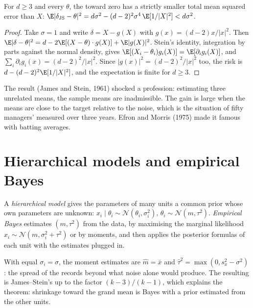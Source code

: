 \begin{theorem}\label{thm:qm:bayesian-methods:js}
For $d \ge 3$ and every $\theta$, the  toward zero has a strictly smaller total mean squared error than $X$:
$\E\lvert\delta_{\mathrm{JS}} - \theta\rvert^2 = d\sigma^2 - (d - 2)^2\sigma^4\,\E[1/\lvert X\rvert^2] < d\sigma^2$.
\end{theorem}

\begin{proof}
Take $\sigma = 1$ and write $\delta = X - g(X)$ with $g(x) = (d - 2)x/\lvert x\rvert^2$. Then $\E\lvert\delta - \theta\rvert^2 = d -
2\E[(X - \theta)\cdot g(X)] + \E\lvert g(X)\rvert^2$. Stein's identity, integration by parts against the normal density, gives
$\E[(X_i - \theta_i)g_i(X)] = \E[\partial_ig_i(X)]$, and $\sum_i\partial_ig_i(x) = (d - 2)^2/\lvert x\rvert^2$. Since $\lvert g(x)\rvert^2 = (d
- 2)^2/\lvert x\rvert^2$ too, the risk is $d - (d - 2)^2\E[1/\lvert X\rvert^2]$, and the expectation is finite for $d \ge 3$.
\end{proof}

The result (James and Stein, 1961) shocked a profession: estimating three unrelated means, the sample means are inadmissible. The gain
is large when the means are close to the target relative to the noise, which is the situation of fifty managers'  measured
over three years. Efron and Morris (1975) made it famous with batting averages.

\section{Hierarchical models and empirical Bayes}

\begin{definition}\label{def:qm:bayesian-methods:hier}
A \emph{hierarchical model} gives the parameters of many units a common prior whose own parameters are
unknown: $x_i \mid \theta_i \sim \mathcal N(\theta_i, \sigma_i^2)$, $\theta_i \sim \mathcal N(m, \tau^2)$. \emph{Empirical
Bayes} estimates $(m, \tau^2)$ from the data, by maximising the marginal likelihood $x_i \sim \mathcal N(m, \sigma_i^2 +
\tau^2)$ or by moments, and then applies the posterior formulas of each unit with the estimates plugged in.
\end{definition}

With equal $\sigma_i = \sigma$, the moment estimates are $\hat m = \bar x$ and $\hat\tau^2 = \max(0, s_x^2 - \sigma^2)$: the spread of the
records beyond what noise alone would produce. The resulting  is James--Stein's up to the factor $(k - 3)/(k - 1)$, which explains
the theorem: shrinkage toward the grand mean is Bayes with a prior estimated from the other units.

